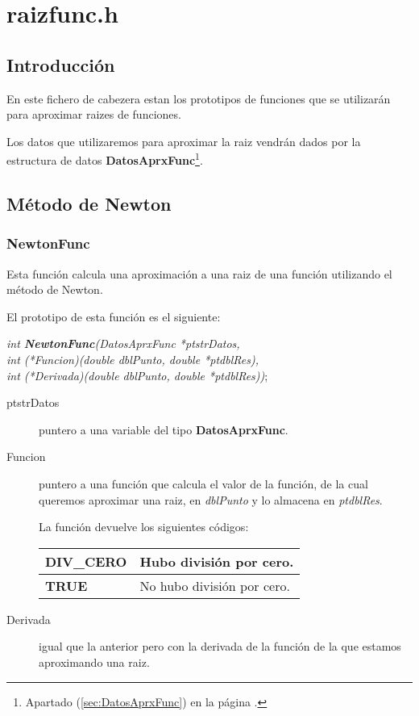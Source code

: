 %
%

\chapter{raizfunc.h}

\section{Introducci\'on}

En este fichero de cabezera estan los prototipos de funciones que se
utilizar\'an para aproximar raizes de funciones.\newline

Los datos que utilizaremos para aproximar la raiz vendr\'an dados por la
estructura de datos \textbf{DatosAprxFunc}\footnote{Apartado
(\ref{sec:DatosAprxFunc}) en la p\'agina \pageref{sec:DatosAprxFunc}.}.

\section{M\'etodo de Newton}

\subsection{NewtonFunc}

Esta funci\'on calcula una aproximaci\'on a una raiz de una funci\'on
utilizando el m\'etodo de Newton.\newline

El prototipo de esta funci\'on es el siguiente:

\begin{center}
\emph{int \textbf{NewtonFunc}(DatosAprxFunc *ptstrDatos,\\
	int (*Funcion)(double dblPunto, double *ptdblRes),\\
	int (*Derivada)(double dblPunto, double *ptdblRes))};
\end{center}

\begin{description}
\item[ptstrDatos] puntero a una variable del tipo \textbf{DatosAprxFunc}.
\item[Funcion] puntero a una funci\'on que calcula el valor de la funci\'on,
de la cual queremos aproximar una raiz, en \emph{dblPunto} y lo almacena en
\emph{ptdblRes}.\newline

La funci\'on devuelve los siguientes c\'odigos:

\begin{center}
\begin{tabular}{|l|l|}
\hline
\textbf{DIV\_CERO} & Hubo divisi\'on por cero. \\
\hline
\textbf{TRUE} & No hubo divisi\'on por cero. \\
\hline
\end{tabular}
\end{center}
\item[Derivada] igual que la anterior pero con la derivada de la funci\'on de
la que estamos aproximando una raiz. 
\end{description}


